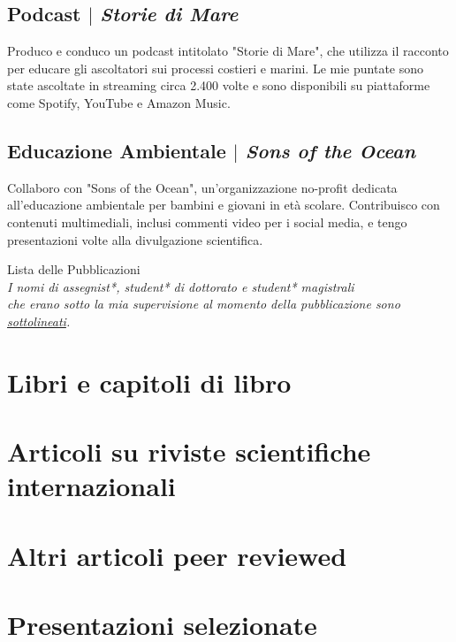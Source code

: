 \documentclass[11pt]{article}
\begin{document}
\subsection{Podcast $|$ {\normalfont\textit{Storie di Mare}}}
{\footnotesize Produco e conduco un podcast intitolato "Storie di Mare", che utilizza il racconto per educare gli ascoltatori sui processi costieri e marini. Le mie puntate sono state ascoltate in streaming circa 2.400 volte e sono disponibili su piattaforme come Spotify, YouTube e Amazon Music.}
\bigskip

\subsection{Educazione Ambientale $|$ {\normalfont\textit{Sons of the Ocean}}}
{\footnotesize Collaboro con "Sons of the Ocean", un'organizzazione no-profit dedicata all'educazione ambientale per bambini e giovani in età scolare. Contribuisco con contenuti multimediali, inclusi commenti video per i social media, e tengo presentazioni volte alla divulgazione scientifica.}

\newpage



\begin{center}
    {\fontsize{36}{36}\selectfont\interthin Lista delle \interheavy Pubblicazioni} \\
\bigskip
        {\color{icnclr}} \textit{{I nomi di assegnist*, student* di dottorato e student* magistrali \\ che erano sotto la mia supervisione al momento della pubblicazione sono \underline{sottolineati}.}}

\end{center}

\nocite{*}
\section{Libri e capitoli di libro}
\printbibliography[type=book,heading=none]

\section{Articoli su riviste scientifiche internazionali}
\printbibliography[type=article,heading=none]

\section{Altri articoli peer reviewed}
\printbibliography[type=periodical,heading=none]

\section{Presentazioni selezionate}
\printbibliography[type=dataset,heading=none]
\printbibliography[type=misc,heading=none]
\end{document}
